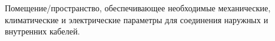 Помещение/пространство, обеспечивающее необходимые
механические, климатические и электрические параметры для 
соединения наружных и внутренних кабелей.